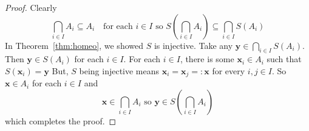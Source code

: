 \documentclass{article}
\theoremstyle{plain}
\theoremstyle{definition}
\theoremstyle{remark}
\begin{document}
\begin{proof}
    Clearly \[
    \bigcap \limits _{i \in I } A_i \subseteq A_i \quad \text{for each } i \in I \text{ so }S \left ( \bigcap_{i \in I} \limits A_i\right )\subseteq \bigcap \limits _{i \in I} S(A_i)
    \]
    In Theorem~\ref{thm:homeo}, we showed $S$ is injective. Take any $\mathbf{y} \in \bigcap \limits _{i \in I} S(A_i)$. Then $\mathbf{y} \in S(A_i)$ for each $i \in I$. For each $i \in I$, there is some $\mathbf{x}_i \in A_i$ such that $S(\mathbf{x}_i) = \mathbf{y}$ But, $S$ being injective means $ \mathbf{x}_i=\mathbf{x}_j =: \mathbf{x} $ for every $i,j \in I$. So $\mathbf{x} \in A_i$ for each $i\in I$ and \[
    \mathbf{x} \in \bigcap \limits _{i \in I}A_i \text{ so } \mathbf{y} \in S \left ( \bigcap \limits _{i \in I}A_i\right )
    \]
    which completes the proof.
\end{proof}

\newpage
\end{document}
